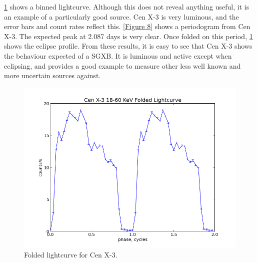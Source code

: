 \ref{Figure 9} shows a binned lightcurve. Although this does not reveal anything useful, it is an example of a particularly good source. Cen X-3 is very luminous, and the error bars and count rates reflect this. \ref{Figure 8} shows a periodogram from Cen X-3. The expected peak at 2.087 days is very clear. Once folded on this period, \ref{Figure 9} shows the eclipse profile. From these results, it is easy to see that Cen X-3 shows the behaviour expected of a SGXB. It is luminous and active except when eclipsing, and provides a good example to measure other less well known and more uncertain sources against. 

\begin{figure}[h!]
\centering
\includegraphics[width=130mm]{gfx/Fig9.png}
\caption{Folded lightcurve for Cen X-3.}
\label{Figure 9}
\end{figure} 

\clearpage
\section{}